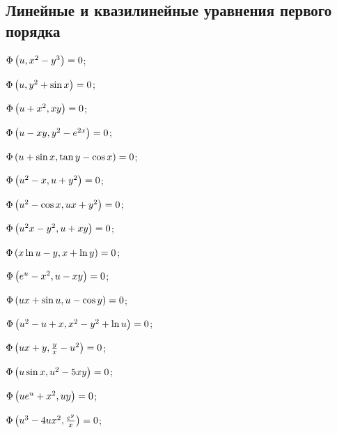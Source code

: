 \subsection*{Линейные и квазилинейные уравнения первого порядка}

	\begin{enumsols}

		\item \( \Phi \left( u, x^2 - y^3 \right) = 0 \); \sfill %
		\item \( \Phi \left( u, y^2 + \sin{x} \right) = 0 \); \sfill %
		\item \( \Phi \left( u + x^2, xy \right) = 0 \); \sfill %
		\item \( \Phi \left( u - xy, y^2 - e^{2x} \right) = 0  \); \sfill %
		\item \( \Phi \left( u + \sin{x}, \tan{y} - \cos{x} \right) = 0 \); \sfill %
		\item \( \Phi \left( u^2 - x, u + y^2 \right) = 0 \); \sfill %
		\item \( \Phi \left( u^2 - \cos{x}, ux + y^2 \right) = 0 \); \sfill %
		\item \( \Phi \left( u^2 x - y^2, u + xy \right) = 0 \); \sfill %
		
		\label{sol:nonlinsys_quazilinear:dim2_part2}
		\item \( \Phi \left( x \ln{u} - y, x + \ln{y} \right) = 0 \); \sfill %
		\item \( \Phi \left( e^u - x^2, u - xy \right) = 0 \); \sfill %
		\item \( \Phi \left( ux + \sin{u}, u - \cos{y} \right) = 0 \); \sfill %
		\item \( \Phi \left( u^2 - u + x, x^2 - y^2 + \ln{u} \right) = 0 \); \sfill %
		\item \( \Phi \left( ux + y, \frac{y}{x} - u^2 \right) = 0 \); \sfill %
		\item \( \Phi \left( u \sin{x}, u^2 - 5xy \right) = 0 \); \sfill %
		\item \( \Phi \left( u e^u + x^2, uy \right) = 0 \); \sfill %
		\item \( \Phi \left( u^3 - 4ux^2, \frac{e^y}{x} \right) = 0 \); \sfill %
		

\end{enumsols}
